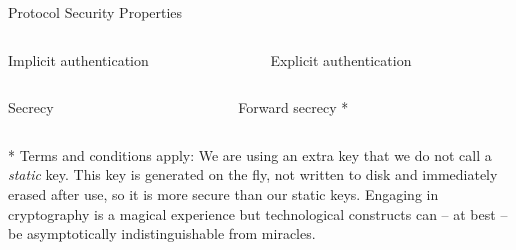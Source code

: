 \begin{frame}[fragile,T]{Protocol Security Properties}
  \small

  \vspace{.2em}
  \begin{columns}[t,fullwidth]
    \begin{column}{.44\linewidth}
      \begin{block}{Implicit authentication}
      \end{block}
    \end{column}

    \hfill

    \begin{column}{.54\linewidth}
      \begin{block}{Explicit authentication}
      \end{block}
    \end{column}
  \end{columns}


  \vspace{2em}
  \begin{columns}[t,fullwidth]
    \begin{column}{.54\linewidth}
      \begin{block}{Secrecy}
      \end{block}
    \end{column}
    \hfill
    \begin{column}{.44\linewidth}
      \begin{block}{Forward secrecy}
        *
      \end{block}
    \end{column}
  \end{columns}

  \vspace{1.5em}
  \footnotesize
  * Terms and conditions apply: We are using an extra key that we do not call a \emph{static} key. This key is generated on the fly,
  not written to disk and immediately erased after use, so it is more secure than our static keys. Engaging in cryptography is a magical
  experience but technological constructs can – at best – be asymptotically indistinguishable from miracles.

\end{frame}



